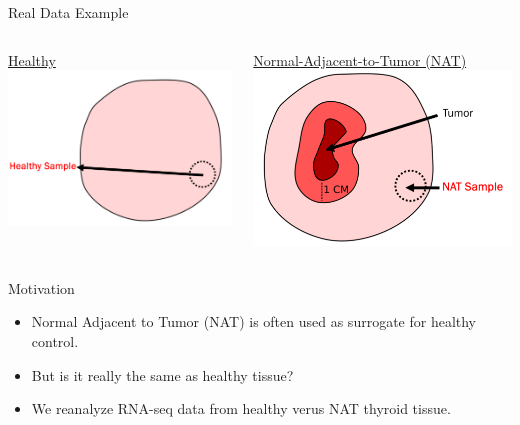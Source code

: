 \documentclass{beamer}
\begin{document}
\begin{frame}[label={sec:org87568f7}]{Real Data Example}
\begin{columns}
  \begin{column}{0.5\textwidth}
   \begin{center}
     \underline{Healthy}
     \includegraphics[scale=0.12]{./images/healthy.png}
   \end{center}
 \end{column}
 \vrule{}
 \begin{column}{0.5\textwidth}  %
   \begin{center}
     \underline{Normal-Adjacent-to-Tumor (NAT)}
     \includegraphics[scale=0.12]{./images/nat.png}
   \end{center}
 \end{column}
\end{columns}
\begin{block}{Motivation}
\begin{itemize}
\item Normal Adjacent to Tumor (NAT) is often used as surrogate for healthy control.
\item But is it really the same as healthy tissue?
\item We reanalyze RNA-seq data from healthy verus NAT thyroid tissue.
\end{itemize}
\end{block}
\end{frame}
\end{document}
